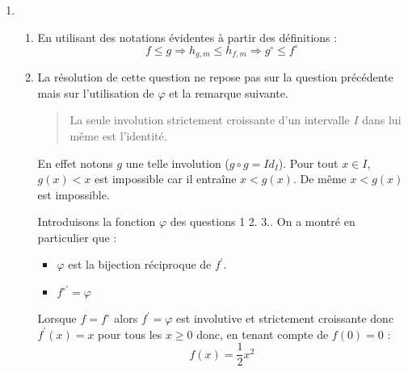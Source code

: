 \begin{enumerate}
\item \begin{enumerate}
 \item En utilisant des notations évidentes à partir des définitions :
\begin{displaymath}
 f\leq g \Rightarrow h_{g,m}\leq h_{f,m} \Rightarrow g^{\circ} \leq f^{\circ}
\end{displaymath}

\item La résolution de cette question ne repose pas sur la question précédente mais sur l'utilisation de $\varphi$ et la remarque suivante.
\begin{quote}
 La seule involution strictement croissante d'un intervalle $I$ dans lui même est l'identité.
\end{quote}
 En effet notons $g$ une telle involution  ($g\circ g =Id_{I}$). Pour tout $x\in I$, $g(x)<x$ est impossible car il entraîne
$x<g(x)$. De même $x<g(x)$ est impossible.

Introduisons la fonction $\varphi$ des questions 1 2. 3.. On a montré en particulier que :
\begin{itemize}
 \item $\varphi$ est la bijection réciproque de $f^\prime$.
 \item $f^{\circ \prime}= \varphi$
\end{itemize}
Lorsque $f=f^{\circ}$ alors $f^{\prime}=\varphi$ est involutive et strictement croissante donc $f^\prime(x)=x$ pour tous les $x\geq 0$ donc, en tenant compte de $f(0)=0$ :
\begin{displaymath}
 f(x)=\dfrac{1}{2}x^2
\end{displaymath}

\end{enumerate}

\end{enumerate}
